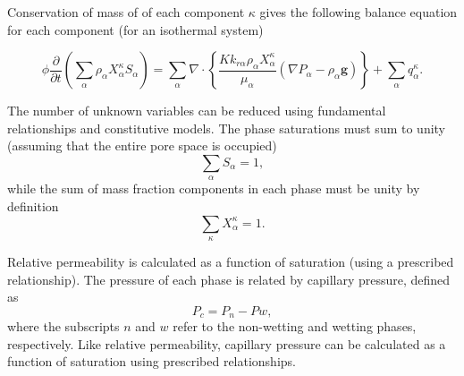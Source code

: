 \documentclass[11pt, oneside, a4paper]{article}
\begin{document}
Conservation of mass of of each component $\kappa$ gives the following balance equation for each component (for an isothermal system)

\begin{equation}
\phi \frac{\partial}{\partial t} \left(\sum_{\alpha} \rho_{\alpha} X_{\alpha}^{\kappa} S_{\alpha} \right) =  \sum_{\alpha} \nabla \cdot \left\{\frac{K k_{r \alpha} \rho_{\alpha} X_{\alpha}^{\kappa}}{\mu_{\alpha}} \left( \nabla P_{\alpha} - \rho_{\alpha} \mathbf{g} \right) \right\} + \sum_{\alpha} q_{\alpha}^{\kappa}.
\label{eq:massbalance}
\end{equation}

The number of unknown variables can be reduced using fundamental relationships and constitutive models. The phase saturations must sum to unity (assuming that the entire pore space is occupied)
\begin{equation}
\sum_{\alpha} S_{\alpha} = 1,
\end{equation}
while the sum of mass fraction components in each phase must be unity by definition
\begin{equation}
\sum_{\kappa} X_{\alpha}^{\kappa} = 1.
\end{equation}

Relative permeability is calculated as a function of saturation (using a prescribed relationship). The pressure of each phase is related by capillary pressure, defined as 
\begin{equation}
P_c = P_n - Pw,
\end{equation}
where the subscripts $n$ and $w$ refer to the non-wetting and wetting phases, respectively. Like relative permeability, capillary pressure can be calculated as a function of saturation using prescribed relationships.
\end{document}
